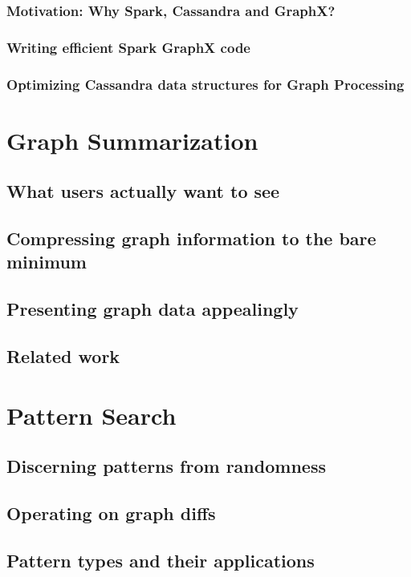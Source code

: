 \documentclass[
        a4paper,     %
        titlepage,   %
        twoside,     %
        parskip      %
        ]{scrartcl}  %
\begin{document}
      \subsubsection{Motivation: Why Spark, Cassandra and GraphX?}
      \subsubsection{Writing efficient Spark GraphX code}
      \subsubsection{Optimizing Cassandra data structures for Graph Processing}
    \pagebreak

  \section{Graph Summarization}
    \subsection{What users actually want to see}
    \subsection{Compressing graph information to the bare minimum}
    \subsection{Presenting graph data appealingly}
    \subsection{Related work}
    \pagebreak

  \section{Pattern Search}
    \subsection{Discerning patterns from randomness}
    \subsection{Operating on graph diffs}
    \subsection{Pattern types and their applications}
\end{document}
